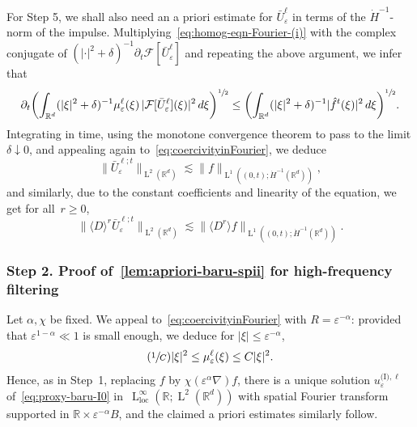 \documentclass[10pt]{amsart}
\newcommand{\Psfrac}[2]{(\sfrac{#1}{#2})}
\theoremstyle{plain}
\theoremstyle{definition}
\numberwithin{equation}{section}
\newcommand{\e}{\varepsilon}
\newcommand{\R}{\mathbb R}
\newcommand{\F}{\mathcal F}
\newcommand{\loc}{{\operatorname{loc}}}
\newcommand{\Ld}{\operatorname{L}}
\newcommand{\step}[1]{\subsubsection*{Step \textup #1}}
\begin{document}
For Step 5, we shall also need an a priori estimate for $\bar U_\e^\ell$ in terms of the \mbox{$\dot{H}^{-1}$-norm} of the impulse. Multiplying~\eqref{eq:homog-eqn-Fourier-(i)} with the complex conjugate of $(|\cdot|^2+\delta)^{-1}\partial_t\F[\bar U_\e^\ell]$ and repeating the above argument, we infer that
\begin{equation*}
\partial_t\biggl(\int_{\R^d}(|\xi|^2+\delta)^{-1}\mu_{\e}^{\ell}(\xi)\,|\F[\bar U_\e^\ell](\xi)|^2\,d\xi\biggr)^{\sfrac{1}{2}}\le \biggl(\int_{\R^d}(|\xi|^2+\delta)^{-1}|\hat{f}^t(\xi)|^2\,d\xi\biggr)^{\sfrac{1}{2}}.
\end{equation*}
{Integrating in time, using the monotone convergence theorem to pass to the limit $\delta\downarrow0$, and appealing again to~\eqref{eq:coercivityinFourier}, we deduce
\begin{equation*}
\|\bar U_\e^{\ell;t}\|_{\Ld^2(\R^d)}\lesssim\|f\|_{\Ld^1((0,t);\dot{H}^{-1}(\R^d))},
\end{equation*}
and} similarly, due to the constant coefficients and linearity of the equation, we get for all~$r\geq 0$,
\begin{equation}\label{eq:negativeNorm}
\|\langle D\rangle^r\bar U_\e^{\ell;t}\|_{\Ld^2(\R^d)}\lesssim \|\langle D^r\rangle f\|_{\Ld^1((0,t);\dot{H}^{-1}(\R^d))}.
\end{equation}

\step{2. Proof of~\eqref{lem:apriori-baru-spii} for high-frequency filtering}
Let $\alpha,\chi$ be fixed. We appeal to~\eqref{eq:coercivityinFourier} with $R=\e^{-\alpha}$: provided that $\e^{1-\alpha}\ll1$ is small enough, we deduce for $|\xi|\le\e^{-\alpha}$,
\begin{equation}\label{eq:coercivitybyfiltering}
\Psfrac{1}{C}|\xi|^2\leq\mu^{\ell}_{\e}(\xi)\leq C|\xi|^2.
\end{equation}
Hence, as in Step~1, replacing $f$ by $\chi(\e^{\alpha}\nabla)f$, there is a unique solution $u_{\e}^{\text{(I)},\ell}$ of~\eqref{eq:proxy-baru-I0} in~$\Ld^\infty_\loc(\R;\Ld^2(\R^d))$ with spatial Fourier transform supported in $\R\times\e^{-\alpha}B$, and the claimed a priori estimates similarly follow.
\end{document}
